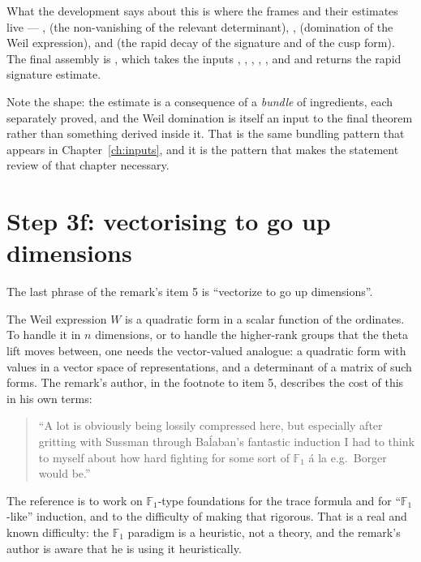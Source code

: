 \begin{seamnote}{What the development says about this}
 is where the frames
and their estimates live --- ,
 (the non-vanishing of the relevant
determinant), ,  (domination of the
Weil expression),  and  (the rapid
decay of the signature and of the cusp form). The final assembly is
, which takes the inputs
, , , , ,
 and  and returns the rapid signature estimate.

Note the shape: the estimate is a consequence of a \emph{bundle} of
ingredients, each separately proved, and the Weil domination  is
itself an input to the final theorem rather than something derived inside it.
That is the same bundling pattern that appears in
Chapter~\ref{ch:inputs}, and it is the pattern that makes the statement review
of that chapter necessary.
\end{seamnote}

\section{Step 3f: vectorising to go up dimensions}The last phrase of the remark's item 5 is ``vectorize to go up dimensions''.

The Weil expression $W$ is a quadratic form in a scalar function of the
ordinates. To handle it in $n$ dimensions, or to handle the higher-rank
groups that the theta lift moves between, one needs the vector-valued
analogue: a quadratic form with values in a vector space of representations,
and a determinant of a matrix of such forms. The remark's author, in the
footnote to item 5, describes the cost of this in his own terms:

\begin{quote}
\small
``A lot is obviously being lossily compressed here, but especially after
gritting with Sussman through Ba\'laban's fantastic induction I had to think
to myself about how hard fighting for some sort of $\mathbb{F}_1$ \'a la e.g.\
Borger would be.''
\end{quote}

The reference is to work on $\mathbb{F}_1$-type foundations for the trace
formula and for ``$\mathbb{F}_1$-like'' induction, and to the difficulty of
making that rigorous. That is a real and known difficulty: the $\mathbb{F}_1$
paradigm is a heuristic, not a theory, and the remark's author is aware that
he is using it heuristically.

